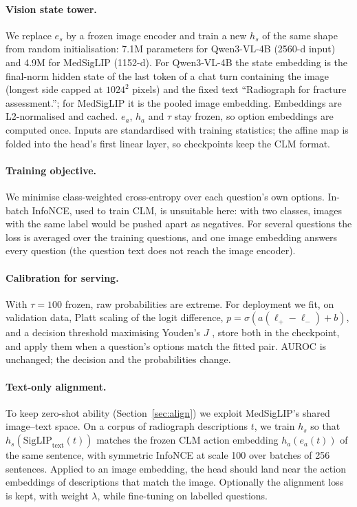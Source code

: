 \documentclass[11pt]{article}
\begin{document}
\paragraph{Vision state tower.} We replace $e_s$ by a frozen image encoder and train a new $h_s$ of the same shape
from random initialisation: 7.1M parameters for Qwen3-VL-4B (2560-d input) and 4.9M for MedSigLIP (1152-d). For
Qwen3-VL-4B the state embedding is the final-norm hidden state of the last token of a chat turn containing the image
(longest side capped at $1024^2$ pixels) and the fixed text ``Radiograph for fracture assessment.''; for MedSigLIP
it is the pooled image embedding. Embeddings are L2-normalised and cached. $e_a$, $h_a$ and $\tau$ stay frozen, so
option embeddings are computed once. Inputs are standardised with training statistics; the affine map is folded
into the head's first linear layer, so checkpoints keep the CLM format.

\paragraph{Training objective.} We minimise class-weighted cross-entropy over each question's own options. In-batch
InfoNCE, used to train CLM, is unsuitable here: with two classes, images with the same label would be pushed apart
as negatives. For several questions the loss is averaged over the training questions, and one image embedding
answers every question (the question text does not reach the image encoder).

\paragraph{Calibration for serving.} With $\tau=100$ frozen, raw probabilities are extreme. For deployment we fit,
on validation data, Platt scaling of the logit difference, $p=\sigma(a(\ell_{+}-\ell_{-})+b)$, and a decision
threshold maximising Youden's $J$ \citep{youden1950index}, store both in the checkpoint, and apply them when a
question's options match the fitted pair. AUROC is unchanged; the decision and the probabilities change.

\paragraph{Text-only alignment.} To keep zero-shot ability (Section~\ref{sec:align}) we exploit MedSigLIP's
shared image--text space. On a corpus of radiograph descriptions $t$, we train $h_s$ so that
$h_s(\mathrm{SigLIP}_{\text{text}}(t))$ matches the frozen CLM action embedding $h_a(e_a(t))$ of the same sentence,
with symmetric InfoNCE \citep{oord2018cpc} at scale 100 over batches of 256 sentences. Applied to an image
embedding, the head should land near the action embeddings of descriptions that match the image. Optionally the
alignment loss is kept, with weight $\lambda$, while fine-tuning on labelled questions.
\end{document}
